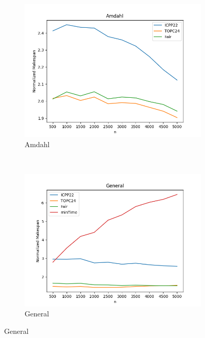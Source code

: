\documentclass{article}
\begin{document}
\begin{figure}[htbp]
\begin{subfigure}[b]{0.32\textwidth}\includegraphics[width=\textwidth]{Results/n/n_Amdahl}\caption{Amdahl}\label{fig:lines_figures_n_Amdahl}\end{subfigure}
\\[2ex]
\begin{subfigure}[b]{0.32\textwidth}\includegraphics[width=\textwidth]{Results/n/n_General}\caption{General}\label{fig:lines_figures_n_General}\end{subfigure}
\hfill

\end{figure}
\end{document}
